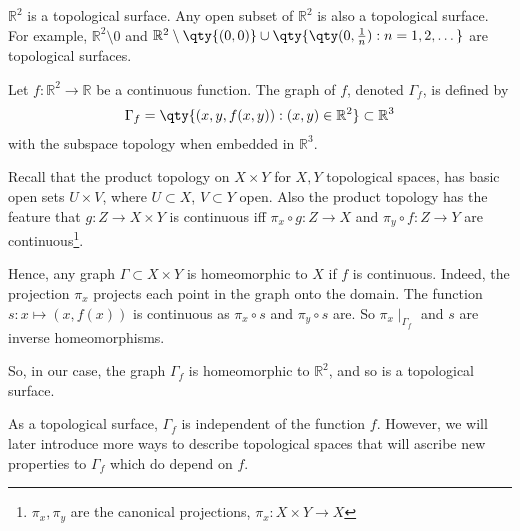 \begin{example}
	$\mathbb R^2$ is a topological surface.
	Any open subset of $\mathbb R^2$ is also a topological surface.
	For example, $\mathbb R^2 \setminus \qty{0}$ and $\mathbb R^2 \setminus \qty{(0,0)} \cup \qty{\qty(0, \frac{1}{n}) : n = 1, 2, \dots}$ are topological surfaces.
\end{example}

\begin{example}
	Let $f : \mathbb R^2 \to \mathbb R$ be a continuous function.
	The graph of $f$, denoted $\Gamma_f$, is defined by
	\begin{align*}
		\Gamma_f = \qty{(x,y,f(x,y)) : (x,y) \in \mathbb R^2} \subset \mathbb{R}^3
	\end{align*}
	with the subspace topology when embedded in $\mathbb R^3$.

	Recall that the product topology on $X \times Y$ for $X, Y$ topological spaces, has basic open sets $U \times V$, where $U \subset X$, $V \subset Y$ open.
	Also the product topology has the feature that $g : Z \to X \times Y$ is continuous iff $\pi_x \circ g : Z \to X$ and $\pi_y \circ f : Z \to Y$ are continuous\footnote{$\pi_x, \pi_y$ are the canonical projections, $\pi_x : X \times Y \to X$}.

	Hence, any graph $\Gamma \subset X \times Y$ is homeomorphic to $X$ if $f$ is continuous.
	Indeed, the projection $\pi_x$ projects each point in the graph onto the domain.
	The function $s : x \mapsto (x,f(x))$ is continuous as $\pi_x \circ s$ and $\pi_y \circ s$ are.
	So $\pi_x \mid_{\Gamma_f}$ and $s$ are inverse homeomorphisms.

	So, in our case, the graph $\Gamma_f$ is homeomorphic to $\mathbb R^2$, and so is a topological surface.
\end{example}

\begin{remark}
	As a topological surface, $\Gamma_f$ is independent of the function $f$.
	However, we will later introduce more ways to describe topological spaces that will ascribe new properties to $\Gamma_f$ which do depend on $f$.
\end{remark}

